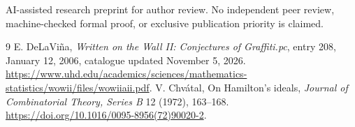\documentclass[11pt,a4paper]{article}
\begin{document}
AI-assisted research preprint for author review. No independent peer review, machine-checked formal proof, or exclusive publication priority is claimed.
\begin{thebibliography}{9}
 E. DeLaVi\~na, \emph{Written on the Wall II: Conjectures of Graffiti.pc}, entry 208, January 12, 2006, catalogue updated November 5, 2026. \url{https://www.uhd.edu/academics/sciences/mathematics-statistics/wowii/files/wowiiaii.pdf}.
 V. Chv\'atal, On Hamilton's ideals, \emph{Journal of Combinatorial Theory, Series B} 12 (1972), 163--168. \url{https://doi.org/10.1016/0095-8956(72)90020-2}.
\end{thebibliography}
\end{document}
